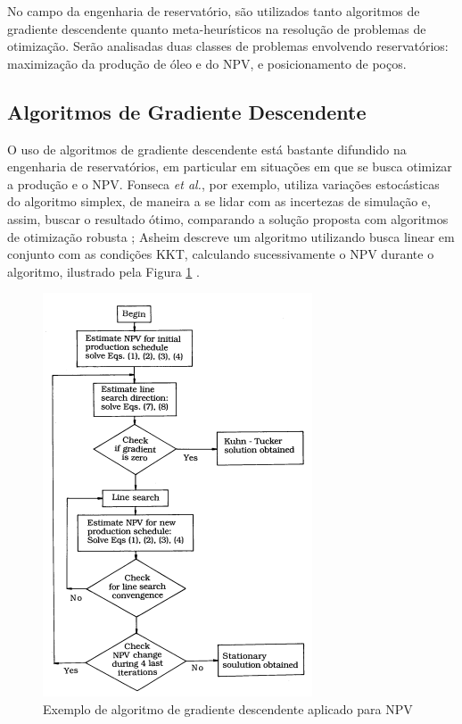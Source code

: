 No campo da engenharia de reservat\'{o}rio, s\~{a}o utilizados tanto algoritmos de gradiente descendente quanto meta-heur\'{i}sticos na resolu\c{c}\~{a}o de problemas de otimiza\c{c}\~{a}o. Ser\~{a}o analisadas duas classes de problemas envolvendo reservat\'{o}rios: maximiza\c{c}\~{a}o da produ\c{c}\~{a}o de \'{o}leo e do NPV, e posicionamento de po\c{c}os.
\nocite{EOR:Intro}


\subsection{Algoritmos de Gradiente Descendente}
O uso de algoritmos de gradiente descendente est\'{a} bastante difundido na engenharia de reservat\'{o}rios, em particular em situa\c{c}\~{o}es em que se busca otimizar a produ\c{c}\~{a}o e o NPV. Fonseca \textit{et al.}, por exemplo, utiliza varia\c{c}\~{o}es estoc\'{a}sticas do algoritmo simplex, de maneira a se lidar com as incertezas de simula\c{c}\~{a}o e, assim, buscar o resultado \'{o}timo, comparando a solu\c{c}\~{a}o proposta com algoritmos de otimiza\c{c}\~{a}o robusta \cite{fonseca}; Asheim descreve um algoritmo utilizando busca linear em conjunto com as condi\c{c}\~{o}es KKT, calculando sucessivamente o NPV durante o algoritmo, ilustrado pela Figura \ref{fig:asheim1} \cite{asheim88}.

\begin{figure}[H]
	\centering
	\includegraphics[width=.5\textwidth]{figs/revisao/revisao_asheim1}
	\caption{Exemplo de algoritmo de gradiente descendente aplicado para NPV \cite{asheim88}\label{fig:asheim1}}
\end{figure}

